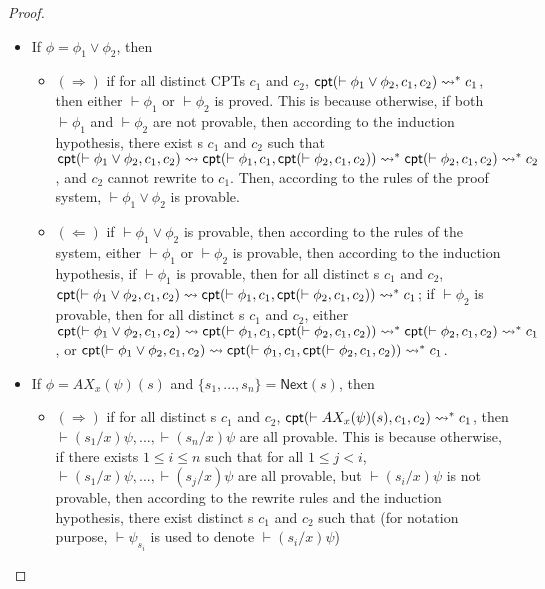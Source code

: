 \begin{proof}
\begin{itemize}
		
		\item If $\phi = \phi_1\vee\phi_2$, then 
		\begin{itemize}
			\item $(\Rightarrow)$ if for all distinct \textsf{CPT}s $c_1$ and $c_2$, $\textsf{cpt}(\vdash \phi_1\vee\phi_2,
			c_1, c_2)\rightsquigarrow^* c_1$, then either $\vdash\phi_1$ or $\vdash\phi_2$ is proved. This is because otherwise, if both $\vdash\phi_1$ and $\vdash\phi_2$ are not provable, then according to the induction hypothesis, there exist \CPT{}s $c_1$ and $c_2$ such that 
			$\textsf{cpt}(\vdash\phi_1\vee\phi_2, c_1,
			c_2)\rightsquigarrow \textsf{cpt}(\vdash \phi_1, c_1, \textsf{cpt}(\vdash\phi_2, c_1, c_2))\rightsquigarrow^*\textsf{cpt}(\vdash\phi_2, c_1, c_2)\rightsquigarrow^*
			c_2$, and $c_2$ cannot rewrite to $c_1$. Then, according to the rules of the proof system, $\vdash\phi_1\vee\phi_2$ is provable.
			\item $(\Leftarrow)$ if $\vdash\phi_1\vee\phi_2$ is provable, then according to the rules of the system, either $\vdash\phi_1$ or $\vdash\phi_2$ is provable, then according to the induction hypothesis, if $\vdash\phi_1$ is provable, then for all distinct \CPT{}s $c_1$ and $c_2$, $\textsf{cpt}(\vdash\phi_1\vee\phi_2, c_1,
			c_2)\rightsquigarrow \textsf{cpt}(\vdash \phi_1, c_1, \textsf{cpt}(\vdash\phi_2, c_1, c_2))\rightsquigarrow^*
			c_1$; if $\vdash\phi_2$ is provable, then for all distinct \CPT{}s $c_1$ and $c_2$, either $\textsf{cpt}(\vdash\phi_1\vee\phi_2, c_1, c_2)\rightsquigarrow \textsf{cpt}(\vdash
			\phi_1, c_1, \textsf{cpt}(\vdash\phi_2, c_1, c_2))\rightsquigarrow^* \textsf{cpt}(\vdash\phi_2,
			c_1, c_2) \rightsquigarrow^* c_1$, or $\textsf{cpt}(\vdash\phi_1\vee\phi_2, c_1, c_2)\rightsquigarrow \textsf{cpt}(\vdash
			\phi_1, c_1, \textsf{cpt}(\vdash\phi_2, c_1, c_2))\rightsquigarrow^* c_1$.
		\end{itemize}
		
		\item If $\phi = AX_x(\psi)(s)$ and $\{s_1,...,s_n\}=\textsf{Next}(s)$, then
		\begin{itemize}
			\item $(\Rightarrow)$ if for all distinct \CPT{}s $c_1$ and $c_2$, 
			$\textsf{cpt}(\vdash AX_x(\psi)(s), c_1, c_2)\rightsquigarrow^* c_1$, then $\vdash(s_1/x)\psi,...,\vdash(s_n/x)\psi$ are all provable. This is because otherwise, if there exists $1\le i\le n$ such that for all $1\le j < i$, $\vdash(s_1/x)\psi,...,\vdash(s_j/x)\psi$ are all provable, but $\vdash(s_i/x)\psi$ is not provable, then according to the rewrite rules and the induction hypothesis, there exist distinct \CPT{}s $c_1$ and $c_2$ such that (for notation purpose, $\vdash\psi_{s_i}$ is used to denote $\vdash(s_i/x)\psi$)
			

\end{itemize}
\end{itemize}
\end{proof}
